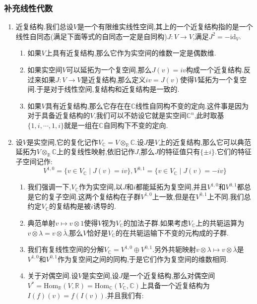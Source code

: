 \subsubsection{补充线性代数}
\begin{enumerate}
	\item 近复结构.我们总设$V$是一个有限维实线性空间,其上的一个近复结构指的是一个线性自同态(满足下面等式的自同态一定是自同构)$J:V\to V$,满足$J^2=-\mathrm{id}_V$.
	\begin{enumerate}[(1)]
		\item 如果$V$上具有近复结构,那么它作为实空间的维数一定是偶数维.
		\item 如果实空间$V$可以延拓为一个复空间,那么$J(v)=iv$构成一个近复结构.反过来如果$J:V\to V$是近复结构,那么定义$iv=J(v)$使得$V$延拓为一个复空间.于是对于线性空间,复结构和近复结构是一致的.
		\item 如果$V$具有近复结构,那么它存在在$\mathbb{C}$线性自同构不变的定向.这件事是因为对于具备近复结构的$V$,我们可以不妨设它就是实空间$\mathbb{C}^n$,此时取基$\{1,i,\cdots,1,i\}$就是一组在$\mathbb{C}$自同构下不变的定向.
	\end{enumerate}
    \item 设$V$是实空间,它的复化记作$V_{\mathbb{C}}=V\otimes_{\mathbb{R}}\mathbb{C}$.设$J$是$V$上的近复结构,那么它可以典范延拓为$V\otimes_{\mathbb{R}}\mathbb{C}$上的复线性映射,依旧记作$J$,那么$J$的特征值只有$\{\pm i\}$.它们的特征子空间记作:
    $$V^{1,0}=\{v\in V_{\mathbb{C}}\mid J(v)=iv\},V^{0,1}=\{v\in V_{\mathbb{C}}\mid J(v)=-iv\}$$
    \begin{enumerate}[(1)]
    	\item 我们强调一下,$V_{\mathbb{C}}$作为实空间,以$J$和$i$都能延拓为复空间,并且$V^{1,0}$和$V^{0,1}$都总是它的复子空间.这两个复结构在子群$V^{1,0}$上一致,但是在$V^{0,1}$上不同.我们总约定$V_{\mathbb{C}}$的复结构是被$i$诱导的.
    	\item 典范单射$v\mapsto v\otimes1$使得$V$视为$V_{\mathbb{C}}$的加法子群.如果考虑$V_{\mathbb{C}}$上的共轭运算为$\overline{v\otimes\lambda}=v\otimes\overline{\lambda}$,那么$V$恰好是$V_{\mathbb{C}}$的在共轭运输下不变的元构成的子群.
    	\item 我们有复线性空间的分解$V_{\mathbb{C}}=V^{1,0}\oplus V^{0,1}$.另外共轭映射$v\otimes\lambda\mapsto v\otimes\overline{\lambda}$是$V^{1,0}$和$V^{0,1}$作为复空间之间的同构,于是它们作为复空间的维数相同.
    	\item 关于对偶空间.设$V$是实空间,设$J$是一个近复结构,那么对偶空间$V^*=\mathrm{Hom}_{\mathbb{R}}(V,\mathbb{R})=\mathrm{Hom}_{\mathbb{C}}(V_{\mathbb{C}},\mathbb{C})$上具备一个近复结构为$I(f)(v)=f(I(v))$.并且我们有:

\end{enumerate}
\end{enumerate}
